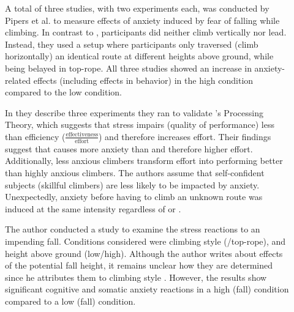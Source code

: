 \begin{description}
	\item[\textcite{Pijpers2003, Pijpers2005, Pijpers2006}] A total of three studies, with two experiments each, was conducted by Pipers et al. to measure effects of anxiety induced by fear of falling while climbing. In contrast to \textcite{Hardy2007}, participants did neither climb vertically nor \gls{lead}. Instead, they used a setup where participants only traversed (climb horizontally) an identical route at different heights above ground, while being belayed in \gls{top-rope}. All three studies showed an increase in anxiety-related effects (including effects in behavior) in the high condition compared to the low condition.
	
	\item[\textcite{Hardy2007}] In  they describe three experiments they ran to validate \citeauthor{Eysenck1992}'s Processing Theory, which suggests that stress impairs (quality of performance) less than efficiency ($\frac{\text{effectiveness}}{\text{effort}}$) and therefore increases effort. Their findings suggest that  causes more anxiety than  and therefore higher effort. Additionally, less anxious climbers transform effort into performing better than highly anxious climbers. The authors assume that self-confident subjects (skillful climbers) are less likely to be impacted by anxiety. Unexpectedly, anxiety before having to climb an unknown route was induced at the same intensity regardless of  or .
	
	\item[\textcite{Bertle2014}] The author conducted a study to examine the stress reactions to an impending fall. Conditions considered were climbing style (/\gls{top-rope}), and height above ground (low/high). Although the author writes about effects of the potential fall height, it remains unclear how they are determined since he attributes them to climbing style \autocite[35]{Bertle2014}. However, the results show significant cognitive and somatic anxiety reactions in a high (fall) condition compared to a low (fall) condition.
\end{description}

